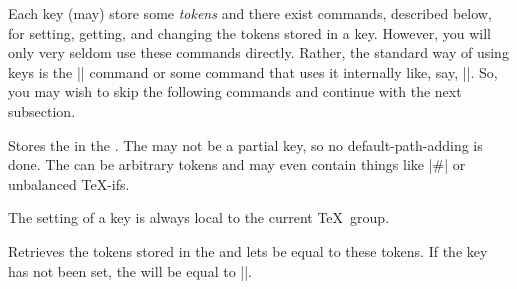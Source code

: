 Each key (may) store some \emph{tokens} and there exist commands, described
below, for setting, getting, and changing the tokens stored in a key. However,
you will only very seldom use these commands directly. Rather, the standard way
of using keys is the |\pgfkeys| command or some command that uses it internally
like, say, |\tikzset|. So, you may wish to skip the following commands and
continue with the next subsection.

\begin{command}{\pgfkeyssetvalue{}}
    Stores the  in the . The 
    may not be a partial key, so no default-path-adding is done. The
     can be arbitrary tokens and may even contain things like
    |#| or unbalanced \TeX-ifs.
\begin{codeexample}[]
\end{codeexample}

    The setting of a key is always local to the current \TeX\ group.
\end{command}



\begin{command}{\pgfkeysgetvalue{}}
    Retrieves the tokens stored in the  and lets  be
    equal to these tokens. If the key has not been set, the  will
    be equal to |\relax|.
\begin{codeexample}[]
\helloworld
\end{codeexample}
\end{command}

